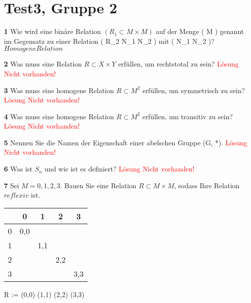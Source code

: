 \documentclass[11pt]{article}
\begin{document}
\section{Test3, Gruppe 2}
    \textbf{1} Wie wird eine binäre Relation $( R_1 \subset M \times M )$ auf der Menge ( M ) genannt im Gegensatz zu einer Relation ( R_2 \subset N_1 \times N_2 ) mit ( N_1 \neq N_2 )?\newline
    $Homogene Relation$\newline

    \textbf{2} Was muss eine Relation \( R \subset X \times Y \) erfüllen, um rechtstotal zu sein?\newline
    \textcolor{red}{Lösung Nicht vorhanden!}\newline

    \textbf{3} Was muss eine homogene Relation \( R \subset M^2 \) erfüllen, um symmetrisch zu sein?\newline
    \textcolor{red}{Lösung Nicht vorhanden!}\newline

    \textbf{4} Was muss eine homogene Relation \( R \subset M^2 \) erfüllen, um transitiv zu sein?\newline
    \textcolor{red}{Lösung Nicht vorhanden!}\newline

    \textbf{5} Nennen Sie die Namen der Eigenschaft einer abelschen Gruppe (G, *).\newline
    \textcolor{red}{Lösung Nicht vorhanden!}\newline

    \textbf{6} Was ist $S_n$ und wie ist es definiert?\newline
    \textcolor{red}{Lösung Nicht vorhanden!}\newline

    \textbf{7} Sei $M = {0,1,2,3}$. Bauen Sie eine Relation $R \subset M \times M$, sodass Ihre Relation $reflexiv$ ist.\newline
\begin{tabular}{c|cccc}
    & 0 & 1 & 2 & 3 \\
    \hline
    0 & 0,0 & & & \\
    1 & & 1,1 & & \\
    2 & & & 2,2 & \\
    3 & & & & 3,3 \\
\end{tabular}\newline
R := {(0,0) (1,1) (2,2) (3,3)}\newline
\end{document}
